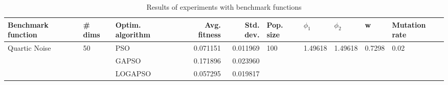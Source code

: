 \begin{table}
\centering
\caption{Results of experiments with benchmark functions}
\begin{tabular}{lllrrlllll}
\toprule
            Benchmark function &             \# dims & Optim. algorithm &  Avg. fitness &  Std. dev. &            Pop. size &               $\phi_{1}$ &               $\phi_{2}$ &                       w &         Mutation rate \\
\midrule
\multirow{3}{*}{Quartic Noise} & \multirow{3}{*}{50} &              PSO &      0.071151 &   0.011969 & \multirow{3}{*}{100} & \multirow{3}{*}{1.49618} & \multirow{3}{*}{1.49618} & \multirow{3}{*}{0.7298} & \multirow{3}{*}{0.02} \\
                               &                     &            GAPSO &      0.171896 &   0.023960 &                      &                          &                          &                         &                       \\
                               &                     &          LOGAPSO &      0.057295 &   0.019817 &                      &                          &                          &                         &                       \\
\bottomrule
\end{tabular}
\end{table}

